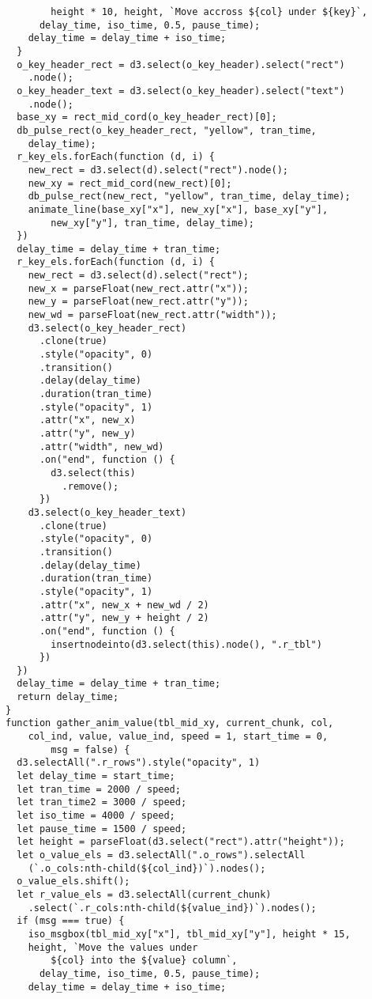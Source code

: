 \begin{lstlisting}
        height * 10, height, `Move accross ${col} under ${key}`,
      delay_time, iso_time, 0.5, pause_time);
    delay_time = delay_time + iso_time;
  }
  o_key_header_rect = d3.select(o_key_header).select("rect")
    .node();
  o_key_header_text = d3.select(o_key_header).select("text")
    .node();
  base_xy = rect_mid_cord(o_key_header_rect)[0];
  db_pulse_rect(o_key_header_rect, "yellow", tran_time, 
    delay_time);
  r_key_els.forEach(function (d, i) {
    new_rect = d3.select(d).select("rect").node();
    new_xy = rect_mid_cord(new_rect)[0];
    db_pulse_rect(new_rect, "yellow", tran_time, delay_time);
    animate_line(base_xy["x"], new_xy["x"], base_xy["y"], 
        new_xy["y"], tran_time, delay_time);
  })
  delay_time = delay_time + tran_time;
  r_key_els.forEach(function (d, i) {
    new_rect = d3.select(d).select("rect");
    new_x = parseFloat(new_rect.attr("x"));
    new_y = parseFloat(new_rect.attr("y"));
    new_wd = parseFloat(new_rect.attr("width"));
    d3.select(o_key_header_rect)
      .clone(true)
      .style("opacity", 0)
      .transition()
      .delay(delay_time)
      .duration(tran_time)
      .style("opacity", 1)
      .attr("x", new_x)
      .attr("y", new_y)
      .attr("width", new_wd)
      .on("end", function () {
        d3.select(this)
          .remove();
      })
    d3.select(o_key_header_text)
      .clone(true)
      .style("opacity", 0)
      .transition()
      .delay(delay_time)
      .duration(tran_time)
      .style("opacity", 1)
      .attr("x", new_x + new_wd / 2)
      .attr("y", new_y + height / 2)
      .on("end", function () {
        insertnodeinto(d3.select(this).node(), ".r_tbl")
      })
  })
  delay_time = delay_time + tran_time;
  return delay_time;
}
function gather_anim_value(tbl_mid_xy, current_chunk, col, 
    col_ind, value, value_ind, speed = 1, start_time = 0, 
        msg = false) {
  d3.selectAll(".r_rows").style("opacity", 1)
  let delay_time = start_time;
  let tran_time = 2000 / speed;
  let tran_time2 = 3000 / speed;
  let iso_time = 4000 / speed;
  let pause_time = 1500 / speed;
  let height = parseFloat(d3.select("rect").attr("height"));
  let o_value_els = d3.selectAll(".o_rows").selectAll
    (`.o_cols:nth-child(${col_ind})`).nodes();
  o_value_els.shift();
  let r_value_els = d3.selectAll(current_chunk)
    .select(`.r_cols:nth-child(${value_ind})`).nodes();
  if (msg === true) {
    iso_msgbox(tbl_mid_xy["x"], tbl_mid_xy["y"], height * 15, 
    height, `Move the values under 
        ${col} into the ${value} column`,
      delay_time, iso_time, 0.5, pause_time);
    delay_time = delay_time + iso_time;

\end{lstlisting}
